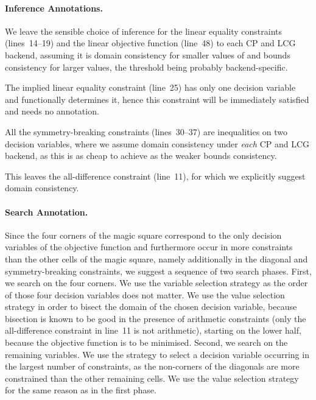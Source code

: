 \documentclass[a4paper,11pt]{article}
\begin{document}
\paragraph{Inference Annotations.}
We leave the sensible choice of inference for the linear equality
constraints (lines~14--19) and the linear objective function (line~48)
to each CP and LCG backend, assuming it is domain consistency for
smaller values of  and bounds consistency for larger
values, the threshold being probably backend-specific.

The implied linear equality constraint (line~25) has only one decision
variable and functionally determines it, hence this constraint will be
immediately satisfied and needs no annotation.

All the symmetry-breaking constraints (lines~30--37) are inequalities
on two decision variables, where we assume domain consistency under
\emph{each} CP and LCG backend, as this is as cheap to achieve as the
weaker bounds consistency.

This leaves the all-difference constraint (line~11), for which we
explicitly suggest domain consistency.

\paragraph{Search Annotation.}
Since the four corners of the magic square correspond to the only
decision variables of the objective function and furthermore occur in
more constraints than the other cells of the magic square, namely
additionally in the diagonal and symmetry-breaking constraints, we
suggest a sequence of two search phases.
%
First, we search on the four corners.  We use the variable selection
strategy  as the order of those four decision
variables does not matter.  We use the value selection strategy
 in order to bisect the domain of the chosen
decision variable, because bisection is known to be good in the
presence of arithmetic constraints (only the all-difference constraint
in line~11 is not arithmetic), starting on the lower half, because the
objective function is to be minimised.
%
Second, we search on the remaining variables.  We use the strategy
 to select a decision variable occurring in the
largest number of constraints, as the non-corners of the diagonals are
more constrained than the other remaining cells.  We use the value
selection strategy  for the same reason as
in the first phase.
\end{document}
